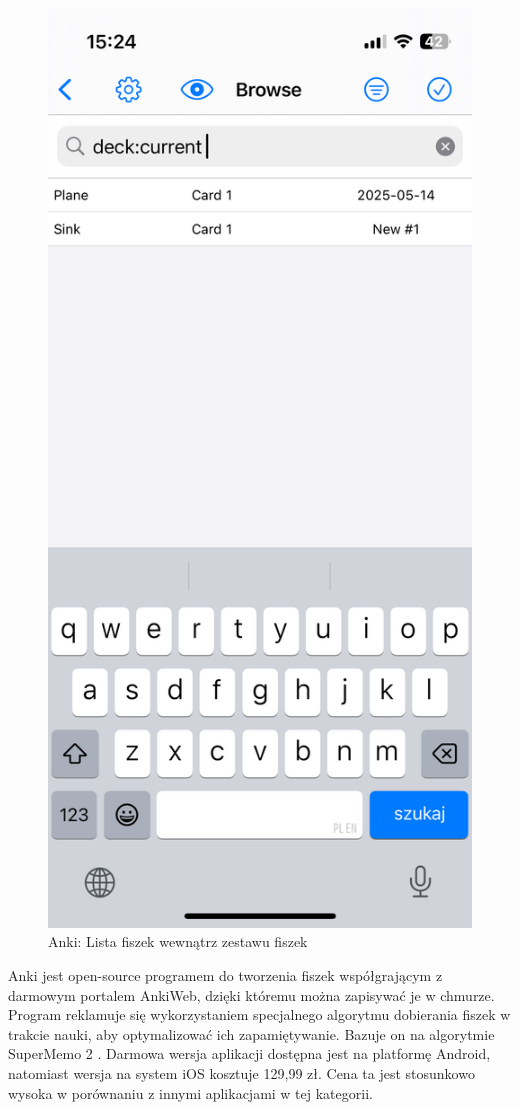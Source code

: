 \documentclass[final,a4paper,openany,12pt]{mwbk}
\begin{document}
\begin{figure}[H]
\begin{minipage}{0.5\textwidth}
  \includegraphics[width=.75\linewidth]{img/anki2.PNG}
  \caption{Anki: Lista fiszek wewnątrz zestawu fiszek}
  \label{fig:anki2}
\end{minipage}
\end{figure}

Anki \cite{anki_appstore} jest open-source programem do tworzenia fiszek współgrającym z darmowym portalem AnkiWeb, dzięki któremu można zapisywać je w chmurze. Program reklamuje się wykorzystaniem specjalnego algorytmu dobierania fiszek w trakcie nauki, aby optymalizować ich zapamiętywanie. Bazuje on na algorytmie SuperMemo 2 \cite{anki_algo}. Darmowa wersja aplikacji dostępna jest na platformę Android, natomiast wersja na system iOS kosztuje 129,99 zł. Cena ta jest stosunkowo wysoka w porównaniu z innymi aplikacjami w tej kategorii.
\end{document}
